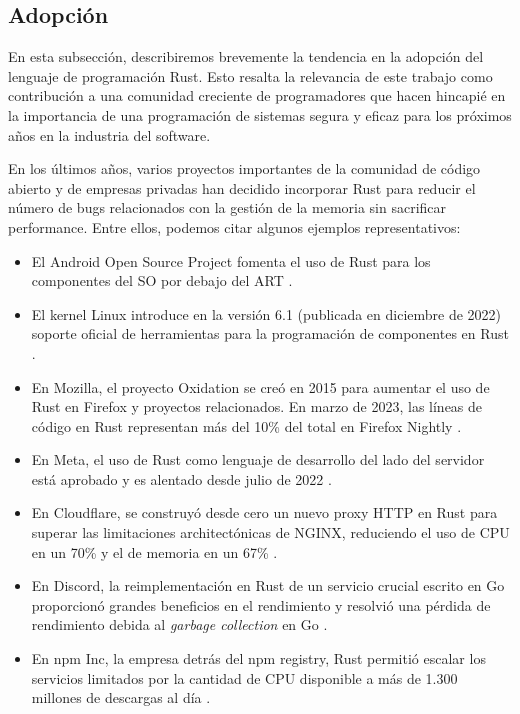 \subsection{Adopción}

En esta subsección, describiremos brevemente la tendencia en la adopción del lenguaje de
programación Rust. Esto resalta la relevancia de este trabajo como contribución a una
comunidad creciente de programadores que hacen hincapié en la importancia de una
programación de sistemas segura y eficaz para los próximos años en la industria del software.

En los últimos años, varios proyectos importantes de la comunidad de código abierto y de
empresas privadas han decidido incorporar Rust para reducir el número de bugs relacionados
con la gestión de la memoria sin sacrificar performance. Entre ellos, podemos citar algunos
ejemplos representativos:

\begin{itemize}
      \item El Android Open Source Project fomenta el uso de Rust para los componentes del
            SO por debajo del \acrfull{ART} \cite{stoep2021}.
      \item El kernel Linux introduce en la versión 6.1 (publicada en diciembre de 2022)
            soporte oficial de herramientas para la programación de componentes en Rust
            \cite{corbet2022,desimone2022}.
      \item En Mozilla, el proyecto Oxidation se creó en 2015 para aumentar el uso de Rust en
            Firefox y proyectos relacionados. En marzo de 2023, las líneas de código en Rust
            representan más del 10\% del total en Firefox Nightly \cite{mozilla-oxidation}.
      \item En Meta, el uso de Rust como lenguaje de desarrollo del lado del servidor está aprobado
            y es alentado desde julio de 2022 \cite{garcia2022}.
      \item En Cloudflare, se construyó desde cero un nuevo proxy HTTP en Rust para superar las
            limitaciones architectónicas de NGINX, reduciendo el uso de CPU en un 70\% y el de
            memoria en un 67\% \cite{wu2022}.
      \item En Discord, la reimplementación en Rust de un servicio crucial escrito en Go
            proporcionó grandes beneficios en el rendimiento y resolvió una pérdida de
            rendimiento debida al \emph{garbage collection} en Go \cite{howarth2020}.
      \item En npm Inc, la empresa detrás del npm registry, Rust permitió escalar los servicios limitados por
            la cantidad de CPU disponible a más de 1.300 millones de descargas al día \cite{rust-npm-case-study}.
\end{itemize}


